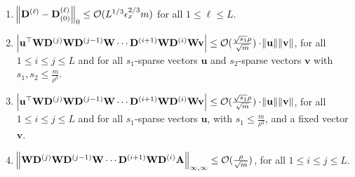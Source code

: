 \begin{lemma}
\begin{enumerate}
		\item $\norm{\mathbf{D}^{(\ell)} - \mathbf{D}_{(0)}^{(\ell)}}_0 \le \mathcal{O}(L^{1/3} \epsilon_x^{2/3}m)$ for all $1 \le 
		\ell \le L$.
		\item $\abs{\mathbf{u}^{\top} \mathbf{W} \mathbf{D}^{(j)} \mathbf{W} \mathbf{D}^{(j-1)} \mathbf{W} \cdots \mathbf{D}^{(i+1)} \mathbf{W} \mathbf{D}^{(i)} \mathbf{W} \mathbf{v}} \le \mathcal{O}(\frac{\sqrt{s_1} \rho}{\sqrt{m}}) \cdot \norm{\mathbf{u}}\norm{\mathbf{v}}$, for all $1 \le i \le j \le L$ and for all $s_1$-sparse vectors $\mathbf{u}$ and $s_2$-sparse vectors $\mathbf{v}$ with $s_1, s_2 \le \frac{m}{\rho^3}$.
		\item  $\abs{\mathbf{u}^{\top} \mathbf{W} \mathbf{D}^{(j)} \mathbf{W} \mathbf{D}^{(j-1)} \mathbf{W} \cdots \mathbf{D}^{(i+1)} \mathbf{W} \mathbf{D}^{(i)} \mathbf{W} \mathbf{v}} \le \mathcal{O}(\frac{\sqrt{s_1} \rho}{\sqrt{m}}) \cdot \norm{\mathbf{u}}\norm{\mathbf{v}}$, for all $1 \le i \le j \le L$ and for all $s_1$-sparse vectors $\mathbf{u}$,  with $s_1 \le \frac{m}{\rho^3}$, and a fixed vector $\mathbf{v}$.
		\item $\norm{\mathbf{W} \mathbf{D}^{(j)} \mathbf{W} \mathbf{D}^{(j-1)} \mathbf{W} \cdots \mathbf{D}^{(i+1)} \mathbf{W}  \mathbf{D}^{(i)} \mathbf{A}}_{\infty, \infty} \le \mathcal{O}(\frac{\rho}{\sqrt{m}})$, for all $1 \le i \le j \le L$.
	\end{enumerate}
\end{lemma}
